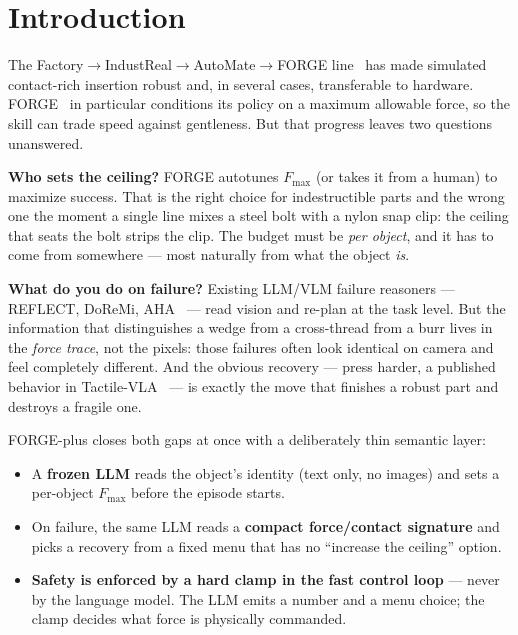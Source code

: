 \documentclass[11pt]{article}
\newcommand{\Fmax}{\ensuremath{F_{\max}}}
\begin{document}
\section{Introduction}
\label{sec:intro}

The Factory$\rightarrow$IndustReal$\rightarrow$AutoMate$\rightarrow$FORGE line~\citep{narang2022factory,tang2023industreal,tang2024automate,noseworthy2025forge} has made simulated contact-rich insertion robust and, in several cases, transferable to hardware. FORGE~\citep{noseworthy2025forge} in particular conditions its policy on a maximum allowable force, so the skill can trade speed against gentleness. But that progress leaves two questions unanswered.

\textbf{Who sets the ceiling?} FORGE autotunes \Fmax{} (or takes it from a human) to maximize success. That is the right choice for indestructible parts and the wrong one the moment a single line mixes a steel bolt with a nylon snap clip: the ceiling that seats the bolt strips the clip. The budget must be \emph{per object}, and it has to come from somewhere --- most naturally from what the object \emph{is}.

\textbf{What do you do on failure?} Existing LLM/VLM failure reasoners --- REFLECT, DoReMi, AHA~\citep{liu2023reflect,guo2023doremi,duan2024aha} --- read vision and re-plan at the task level. But the information that distinguishes a wedge from a cross-thread from a burr lives in the \emph{force trace}, not the pixels: those failures often look identical on camera and feel completely different. And the obvious recovery --- press harder, a published behavior in Tactile-VLA~\citep{huang2025tactilevla} --- is exactly the move that finishes a robust part and destroys a fragile one.

FORGE-plus closes both gaps at once with a deliberately thin semantic layer:
\begin{itemize}
  \item A \textbf{frozen LLM} reads the object's identity (text only, no images) and sets a per-object \Fmax{} before the episode starts.
  \item On failure, the same LLM reads a \textbf{compact force/contact signature} and picks a recovery from a fixed menu that has no ``increase the ceiling'' option.
  \item \textbf{Safety is enforced by a hard clamp in the fast control loop} --- never by the language model. The LLM emits a number and a menu choice; the clamp decides what force is physically commanded.
\end{itemize}
\end{document}
